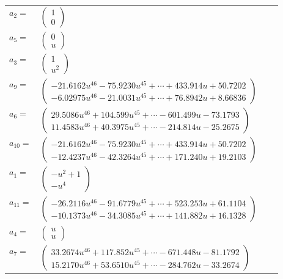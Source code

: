 \documentclass[1p]{elsarticle_modified}
\theoremstyle{definition}
\begin{document}
\begin{tabular}{m{7pt} m{180pt} m{7pt} m{180pt} }
\flushright $a_{2}=$&$\begin{pmatrix}1\\0\end{pmatrix}$ \\
\flushright $a_{5}=$&$\begin{pmatrix}0\\u\end{pmatrix}$ \\
\flushright $a_{3}=$&$\begin{pmatrix}1\\u^2\end{pmatrix}$ \\
\flushright $a_{9}=$&$\begin{pmatrix}-21.6162 u^{46}-75.9230 u^{45}+\cdots+433.914 u+50.7202\\-6.02975 u^{46}-21.0031 u^{45}+\cdots+76.8942 u+8.66836\end{pmatrix}$ \\
\flushright $a_{6}=$&$\begin{pmatrix}29.5086 u^{46}+104.599 u^{45}+\cdots-601.499 u-73.1793\\11.4583 u^{46}+40.3975 u^{45}+\cdots-214.814 u-25.2675\end{pmatrix}$ \\
\flushright $a_{10}=$&$\begin{pmatrix}-21.6162 u^{46}-75.9230 u^{45}+\cdots+433.914 u+50.7202\\-12.4237 u^{46}-42.3264 u^{45}+\cdots+171.240 u+19.2103\end{pmatrix}$ \\
\flushright $a_{1}=$&$\begin{pmatrix}- u^2+1\\- u^4\end{pmatrix}$ \\
\flushright $a_{11}=$&$\begin{pmatrix}-26.2116 u^{46}-91.6779 u^{45}+\cdots+523.253 u+61.1104\\-10.1373 u^{46}-34.3085 u^{45}+\cdots+141.882 u+16.1328\end{pmatrix}$ \\
\flushright $a_{4}=$&$\begin{pmatrix}u\\u\end{pmatrix}$ \\
\flushright $a_{7}=$&$\begin{pmatrix}33.2674 u^{46}+117.852 u^{45}+\cdots-671.448 u-81.1792\\15.2170 u^{46}+53.6510 u^{45}+\cdots-284.762 u-33.2674\end{pmatrix}$ \\

\end{tabular}
\end{document}
